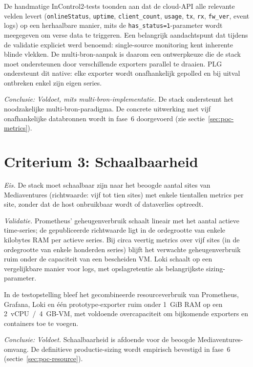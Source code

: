 De handmatige InControl2-tests toonden aan dat de cloud-API alle relevante velden levert (\texttt{onlineStatus}, \texttt{uptime}, \texttt{client\_count}, \texttt{usage}, \texttt{tx}, \texttt{rx}, \texttt{fw\_ver}, event logs) op een herhaalbare manier, mits de \texttt{has\_status=1}-parameter wordt meegegeven om verse data te triggeren. Een belangrijk aandachtspunt dat tijdens de validatie expliciet werd benoemd: single-source monitoring kent inherente blinde vlekken. De multi-bron-aanpak is daarom een ontwerpkeuze die de stack moet ondersteunen door verschillende exporters parallel te draaien. PLG ondersteunt dit native: elke exporter wordt onafhankelijk gepolled en bij uitval ontbreken enkel zijn eigen series.

\emph{Conclusie:} \emph{Voldoet, mits multi-bron-implementatie.} De stack ondersteunt het noodzakelijke multi-bron-paradigma. De concrete uitwerking met vijf onafhankelijke databronnen wordt in fase~6 doorgevoerd (zie sectie~\ref{sec:poc-metrics}).

\section*{Criterium 3: Schaalbaarheid}

\emph{Eis.} De stack moet schaalbaar zijn naar het beoogde aantal sites van Mediaventures (richtwaarde: vijf tot tien sites) met enkele tientallen metrics per site, zonder dat de host onbruikbaar wordt of dataverlies optreedt.

\emph{Validatie.} Prometheus' geheugenverbruik schaalt lineair met het aantal actieve time-series; de gepubliceerde richtwaarde ligt in de ordegrootte van enkele kilobytes RAM per actieve series. Bij circa veertig metrics over vijf sites (in de ordegrootte van enkele honderden series) blijft het verwachte geheugenverbruik ruim onder de capaciteit van een bescheiden VM. Loki schaalt op een vergelijkbare manier voor logs, met opslagretentie als belangrijkste sizing-parameter.

In de testopstelling bleef het gecombineerde resourceverbruik van Prometheus, Grafana, Loki en één prototype-exporter ruim onder 1~GiB RAM op een 2~vCPU~/~4~GB-VM, met voldoende overcapaciteit om bijkomende exporters en containers toe te voegen.

\emph{Conclusie:} \emph{Voldoet.} Schaalbaarheid is afdoende voor de beoogde Mediaventures-omvang. De definitieve productie-sizing wordt empirisch bevestigd in fase~6 (sectie~\ref{sec:poc-resource}).

